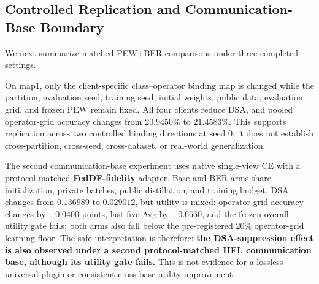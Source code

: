 \documentclass[10pt,twocolumn]{article}
\begin{document}
\subsection{Controlled Replication and Communication-Base Boundary}

We next summarize matched PEW+BER comparisons under three completed settings.

\begin{table}[t]
\centering
\small
\caption{Cross-setting mitigation summary. Utility values are matched intervention-minus-baseline deltas within each setting.}
\label{tab:auto3}
\end{table}

On map1, only the client-specific class--operator binding map is changed while the partition, evaluation seed, training seed, initial weights, public data, evaluation grid, and frozen PEW remain fixed. All four clients reduce DSA, and pooled operator-grid accuracy changes from \(20.9450\%\) to \(21.4583\%\). This supports replication across two controlled binding directions at seed 0; it does not establish cross-partition, cross-seed, cross-dataset, or real-world generalization.

The second communication-base experiment uses native single-view CE with a protocol-matched \textbf{FedDF-fidelity} adapter. Base and BER arms share initialization, private batches, public distillation, and training budget. DSA changes from \(0.136989\) to \(0.029012\), but utility is mixed: operator-grid accuracy changes by \(-0.0400\) points, last-five Avg by \(-0.6660\), and the frozen overall utility gate fails; both arms also fall below the pre-registered 20\% operator-grid learning floor. The safe interpretation is therefore: \textbf{the DSA-suppression effect is also observed under a second protocol-matched HFL communication base, although its utility gate fails.} This is not evidence for a lossless universal plugin or consistent cross-base utility improvement.
\end{document}
